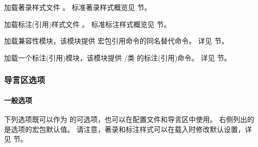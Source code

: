 \begin{optionlist}
加载著录样式文件 。
标准著录样式概览见  节。



加载标注(引用)样式文件 。
标准标注样式概览见  节。



加载兼容性模块，该模块提供  宏包引用命令的同名替代命令。
详见  节。



加载一个标注(引用)模块，该模块提供 \slash 类  的标注(引用)命令。
详见  节。

\end{optionlist}

\subsubsection{导言区选项}%
\label{use:opt:pre}

\paragraph{一般选项}%
\label{use:opt:pre:gen}


下列选项既可以作为  的可选项，也可以在配置文件和导言区中使用。
右侧列出的是选项的宏包默认值。
请注意，著录和标注样式可以在载入时修改默认设置，详见  节。

